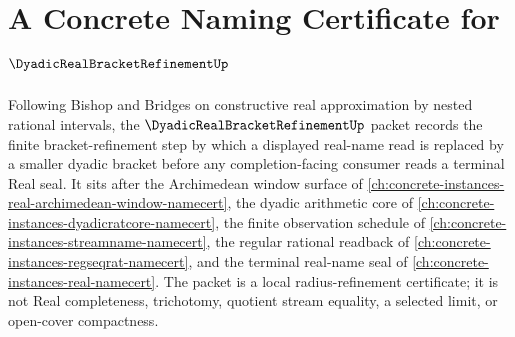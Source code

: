 \chapter{A Concrete Naming Certificate for $\DyadicRealBracketRefinementUp$}
\label{ch:concrete-instances-dyadic-real-bracket-refinement-namecert}

Following Bishop and Bridges on constructive real approximation by nested rational intervals, the $\DyadicRealBracketRefinementUp$ packet records the finite bracket-refinement step by which a displayed real-name read is replaced by a smaller dyadic bracket before any completion-facing consumer reads a terminal Real seal. It sits after the Archimedean window surface of \autoref{ch:concrete-instances-real-archimedean-window-namecert}, the dyadic arithmetic core of \autoref{ch:concrete-instances-dyadicratcore-namecert}, the finite observation schedule of \autoref{ch:concrete-instances-streamname-namecert}, the regular rational readback of \autoref{ch:concrete-instances-regseqrat-namecert}, and the terminal real-name seal of \autoref{ch:concrete-instances-real-namecert}. The packet is a local radius-refinement certificate; it is not Real completeness, trichotomy, quotient stream equality, a selected limit, or open-cover compactness.

